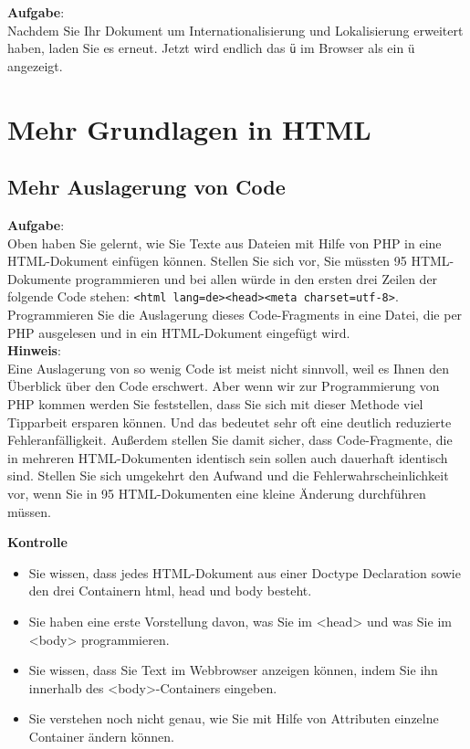 \textbf{Aufgabe}:\\

Nachdem Sie Ihr Dokument um Internationalisierung und Lokalisierung erweitert haben, laden Sie es erneut. Jetzt wird endlich das \verb|ü| im Browser als ein ü angezeigt.

\section{Mehr Grundlagen in HTML}

\subsection{Mehr Auslagerung von Code}

\textbf{Aufgabe}:\\

Oben haben Sie gelernt, wie Sie Texte aus Dateien mit Hilfe von PHP in eine HTML-Dokument einfügen können. Stellen Sie sich vor, Sie müssten 95 HTML-Dokumente programmieren und bei allen würde in den ersten drei Zeilen der folgende Code stehen: \verb|<html lang=de><head><meta charset=utf-8>|.\\

Programmieren Sie die Auslagerung dieses Code-Fragments in eine Datei, die per PHP ausgelesen und in ein HTML-Dokument eingefügt wird.\\

\textbf{Hinweis}:\\

Eine Auslagerung von so wenig Code ist meist nicht sinnvoll, weil es Ihnen den Überblick über den Code erschwert. Aber wenn wir zur Programmierung von PHP kommen werden Sie feststellen, dass Sie sich mit dieser Methode viel Tipparbeit ersparen können. Und das bedeutet sehr oft eine deutlich reduzierte Fehleranfälligkeit. Außerdem stellen Sie damit sicher, dass Code-Fragmente, die in mehreren HTML-Dokumenten identisch sein sollen auch dauerhaft identisch sind. Stellen Sie sich umgekehrt den Aufwand und die Fehlerwahrscheinlichkeit vor, wenn Sie in 95 HTML-Dokumenten eine kleine Änderung durchführen müssen.

\textbf{Kontrolle}

\begin{itemize}
	\item Sie wissen, dass jedes HTML-Dokument aus einer Doctype Declaration sowie den drei Containern html, head und body besteht.
	\item Sie haben eine erste Vorstellung davon, was Sie im <head> und was Sie im <body> programmieren.
	\item Sie wissen, dass Sie Text im Webbrowser anzeigen können, indem Sie ihn innerhalb des <body>-Containers eingeben.
	\item Sie verstehen noch nicht genau, wie Sie mit Hilfe von Attributen einzelne Container ändern können.
\end{itemize}

